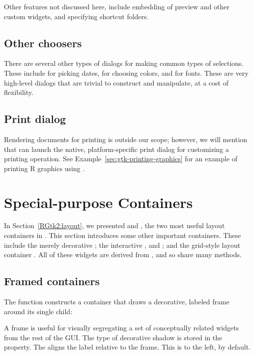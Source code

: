 Other features not discussed here, include embedding of preview and
other custom widgets, and specifying shortcut folders.

\subsection{Other choosers}

There are several other types of dialogs for making common types of
selections. These include  for picking dates,
 for choosing colors, and
 for fonts. These are very high-level
dialogs that are trivial to construct and manipulate, at a cost of
flexibility.

\subsection{Print dialog}

Rendering documents for printing is outside our scope; however, we
will mention that  can launch the native,
platform-specific print dialog for customizing a printing
operation. See Example~\ref{sec:gtk-printing-graphics} for an example
of printing R graphics using .


\section{Special-purpose Containers}
\label{sec:containers}

In Section~\ref{RGtk2:layout}, we presented  and
, the two most useful layout containers in
\GTK. This section introduces some other important containers. These
include the merely decorative ; the interactive
,  and ; and the
grid-style layout container . All of these widgets are
derived from , and so share many methods.

\subsection{Framed containers}
\label{sec:RGtk2:gtkFrame}

The  function constructs a container that draws
a decorative, labeled frame around its single child:
\begin{Schunk}
\end{Schunk}
%
A frame is useful for visually segregating a set of conceptually
related widgets from the rest of the GUI. The type of decorative
shadow is stored in the  property.  The
 aligns the label relative to the
frame. This is to the left, by default.

